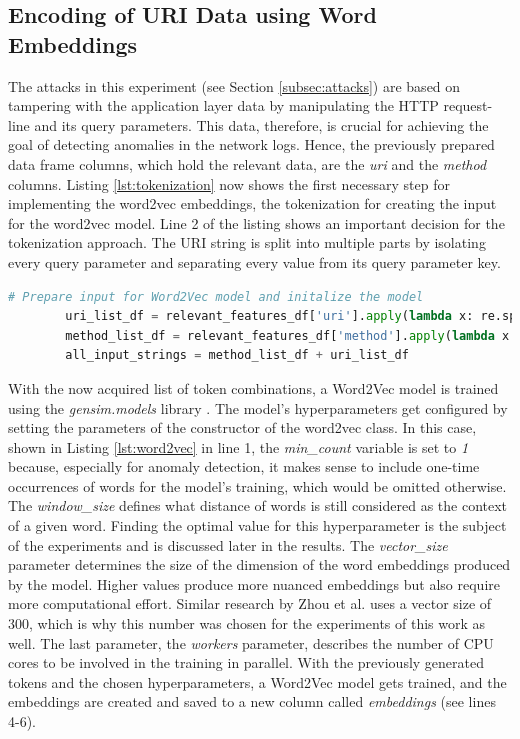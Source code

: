 \subsection{Encoding of URI Data using Word Embeddings}
The attacks in this experiment (see Section \ref{subsec:attacks}) are based on tampering with the application layer data by manipulating the HTTP request-line and its query parameters. This data, therefore, is crucial for achieving the goal of detecting anomalies in the network logs. Hence, the previously prepared data frame columns, which hold the relevant data, are the \emph{uri} and the \emph{method} columns. Listing \ref{lst:tokenization} now shows the first necessary step for implementing the word2vec embeddings, the tokenization for creating the input for the word2vec model. Line 2 of the listing shows an important decision for the tokenization approach. The URI string is split into multiple parts by isolating every query parameter and separating every value from its query parameter key. 

\begin{minipage}\linewidth
	\begin{lstlisting}[language={python}, caption={Tokenization of the features for word embeddings}, label={lst:tokenization}] 
        # Prepare input for Word2Vec model and initalize the model
        uri_list_df = relevant_features_df['uri'].apply(lambda x: re.split('[/?&=]', x))
        method_list_df = relevant_features_df['method'].apply(lambda x: [x])
        all_input_strings = method_list_df + uri_list_df
	\end{lstlisting}
\end{minipage}


With the now acquired list of token combinations, a Word2Vec model is trained using the \emph{gensim.models} library \cite{gensim2021}. The model's hyperparameters get configured by setting the parameters of the constructor of the word2vec class. In this case, shown in Listing \ref{lst:word2vec} in line 1, the \emph{min\_count} variable is set to \emph{1} because, especially for anomaly detection, it makes sense to include one-time occurrences of words for the model's training, which would be omitted otherwise. The \emph{window\_size} defines what distance of words is still considered as the context of a given word. Finding the optimal value for this hyperparameter is the subject of the experiments and is discussed later in the results. The \emph{vector\_size} parameter determines the size of the dimension of the word embeddings produced by the model. Higher values produce more nuanced embeddings but also require more computational effort. Similar research by Zhou et al. \cite{zhuo2017network} uses a vector size of 300, which is why this number was chosen for the experiments of this work as well. The last parameter, the \emph{workers} parameter, describes the number of CPU cores to be involved in the training in parallel. With the previously generated tokens and the chosen hyperparameters, a Word2Vec model gets trained, and the embeddings are created and saved to a new column called \emph{embeddings} (see lines 4-6).


